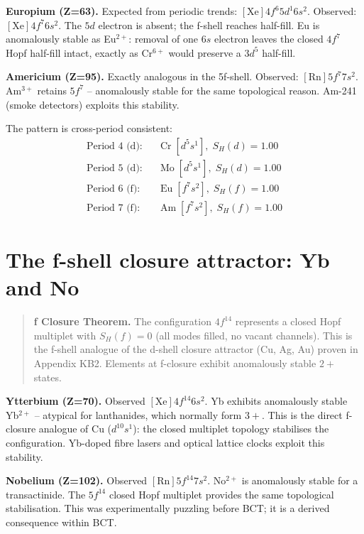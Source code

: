 \documentclass[aps,prl,onecolumn,superscriptaddress]{revtex4-2}
\begin{document}
\textbf{Europium (Z=63).}
Expected from periodic trends: $[\mathrm{Xe}]4f^6 5d^1 6s^2$.
Observed: $[\mathrm{Xe}]4f^7 6s^2$.
The $5d$ electron is absent; the f-shell reaches half-fill.
Eu is anomalously stable as Eu$^{2+}$: removal of one $6s$ electron
leaves the closed $4f^7$ Hopf half-fill intact, exactly as
Cr$^{6+}$ would preserve a $3d^5$ half-fill.

\textbf{Americium (Z=95).}
Exactly analogous in the 5f-shell.
Observed: $[\mathrm{Rn}]5f^7 7s^2$.
Am$^{3+}$ retains $5f^7$ -- anomalously stable for the same
topological reason. Am-241 (smoke detectors) exploits this stability.

The pattern is cross-period consistent:
\begin{align}
  \text{Period 4 (d):}\quad & \mathrm{Cr}\; [d^5 s^1],\;
    S_H(d) = 1.00 \nonumber\\
  \text{Period 5 (d):}\quad & \mathrm{Mo}\; [d^5 s^1],\;
    S_H(d) = 1.00 \nonumber\\
  \text{Period 6 (f):}\quad & \mathrm{Eu}\; [f^7 s^2],\;
    S_H(f) = 1.00 \nonumber\\
  \text{Period 7 (f):}\quad & \mathrm{Am}\; [f^7 s^2],\;
    S_H(f) = 1.00
\end{align}

\section{The f-shell closure attractor: Yb and No}

\begin{quotation}
\textbf{f Closure Theorem.}
The configuration $4f^{14}$ represents a closed Hopf multiplet
with $S_H(f) = 0$ (all modes filled, no vacant channels).
This is the f-shell analogue of the d-shell closure attractor
(Cu, Ag, Au) proven in Appendix KB2. Elements at f-closure
exhibit anomalously stable $2+$ states.
\end{quotation}

\textbf{Ytterbium (Z=70).}
Observed $[\mathrm{Xe}]4f^{14}6s^2$.
Yb exhibits anomalously stable Yb$^{2+}$ -- atypical for
lanthanides, which normally form $3+$. This is the direct
f-closure analogue of Cu ($d^{10}s^1$): the closed multiplet
topology stabilises the configuration.
Yb-doped fibre lasers and optical lattice clocks exploit this stability.

\textbf{Nobelium (Z=102).}
Observed $[\mathrm{Rn}]5f^{14}7s^2$.
No$^{2+}$ is anomalously stable for a transactinide.
The $5f^{14}$ closed Hopf multiplet provides the same
topological stabilisation. This was experimentally puzzling
before BCT; it is a derived consequence within BCT.
\end{document}
